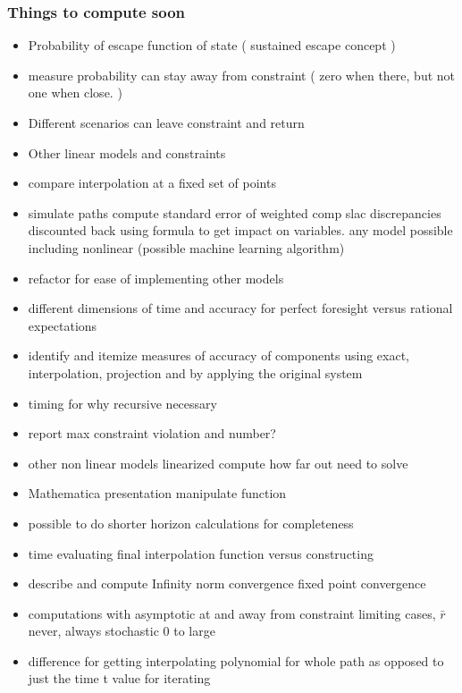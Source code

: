 \documentclass{beamer}
\begin{document}
   \begin{frame}
     \frametitle{Things to compute soon}
     \begin{itemize}
 \item Probability of escape function of state  ( sustained escape concept )
 \item measure probability can stay away from constraint  ( zero when there, but not one when close. )
 \item Different scenarios can leave constraint and return
 \item Other linear models and constraints
 \item compare interpolation at a fixed set of points
     \item simulate paths compute standard error of weighted comp slac discrepancies discounted back using formula to get impact on variables.  any model possible including nonlinear  (possible machine learning algorithm)
 \item refactor for ease of implementing other models
 \item different dimensions of time and accuracy for perfect foresight versus rational expectations
 \item identify and itemize measures of accuracy of components using exact, interpolation, projection and by applying the original system
     \item timing for why recursive necessary
     \item report max constraint violation and number?
     \item other non linear models linearized compute how far out need to solve
     \item Mathematica presentation manipulate function
     \item possible to do shorter horizon calculations for completeness
     \item time evaluating final interpolation function versus constructing
     \item describe and compute Infinity norm convergence fixed point convergence
 \item computations with asymptotic at and away from constraint limiting cases, $\bar{r}$ never, always  stochastic 0 to large
 \item difference for getting interpolating polynomial for whole path as opposed to just the time t value for iterating
     \end{itemize}
   \end{frame}
\end{document}
